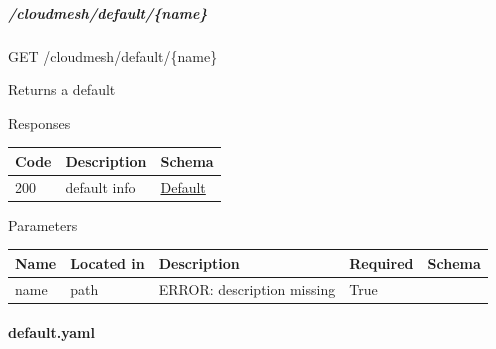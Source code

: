 \documentclass[9pt,]{article}
\let\oldparagraph\paragraph
\renewcommand{\paragraph}[1]{\oldparagraph{#1}\mbox{}}
\let\oldsubparagraph\subparagraph
\renewcommand{\subparagraph}[1]{\oldsubparagraph{#1}\mbox{}}
\begin{document}
\hypertarget{cloudmeshdefaultname}{%
\subparagraph{/cloudmesh/default/\{name\}}\label{cloudmeshdefaultname}}

GET /cloudmesh/default/\{name\}

Returns a default

Responses

\begin{longtable}[]{@{}lll@{}}
\toprule
Code & Description & Schema\tabularnewline
\midrule
\endhead
200 & default info & \protect\hyperlink{default}{Default}\tabularnewline
\bottomrule
\end{longtable}

Parameters

\begin{longtable}[]{@{}lllll@{}}
\toprule
Name & Located in & Description & Required & Schema\tabularnewline
\midrule
\endhead
name & path & ERROR: description missing & True &\tabularnewline
\bottomrule
\end{longtable}

\hypertarget{default.yaml}{%
\paragraph{default.yaml}\label{default.yaml}}
\end{document}
